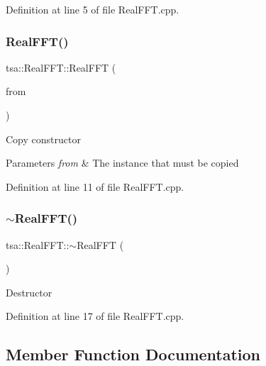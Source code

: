 Definition at line 5 of file Real\+F\+F\+T.\+cpp.

\mbox{\label{classtsa_1_1_real_f_f_t_a2c65c00ea09121cceb8804b9d5e1c395}} 
\subsubsection{\texorpdfstring{Real\+F\+F\+T()}{RealFFT()}\hspace{0.1cm}{\footnotesize\ttfamily [2/2]}}
{\footnotesize\ttfamily tsa\+::\+Real\+F\+F\+T\+::\+Real\+F\+FT (\begin{DoxyParamCaption}\item[{const \hyperlink{classtsa_1_1_real_f_f_t}{Real\+F\+FT} \&}]{from }\end{DoxyParamCaption})}

Copy constructor


\begin{DoxyParams}{Parameters}
{\em from} & The instance that must be copied \\
\hline
\end{DoxyParams}


Definition at line 11 of file Real\+F\+F\+T.\+cpp.

\mbox{\label{classtsa_1_1_real_f_f_t_a51eccd426b1802e0c245c8dd4006dc3e}} 
\subsubsection{\texorpdfstring{$\sim$\+Real\+F\+F\+T()}{~RealFFT()}}
{\footnotesize\ttfamily tsa\+::\+Real\+F\+F\+T\+::$\sim$\+Real\+F\+FT (\begin{DoxyParamCaption}{ }\end{DoxyParamCaption})\hspace{0.3cm}{\ttfamily [virtual]}}

Destructor 

Definition at line 17 of file Real\+F\+F\+T.\+cpp.



\subsection{Member Function Documentation}
\mbox{\label{classtsa_1_1_real_f_f_t_a571915c01137937b542c88c3094b9e50}} 
